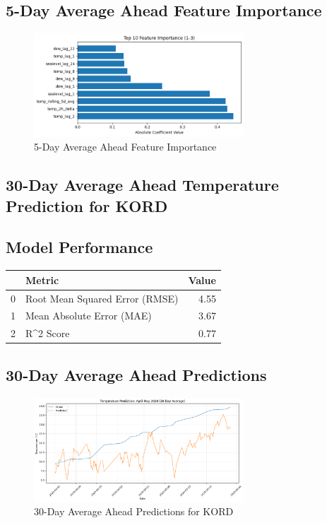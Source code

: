 \subsection{5-Day Average Ahead Feature Importance}
\begin{figure}[htbp]
\centering
\includegraphics[width=0.7\textwidth]{1-3-linear_temp_shift_feature_importance.png}
\caption{5-Day Average Ahead Feature Importance}
\label{fig:5-day_average_ahead_featimp}
\end{figure}



\subsection{30-Day Average Ahead Temperature Prediction for KORD}
\subsection{Model Performance}
\begin{tabular}{llr}
\toprule
 & Metric & Value \\
\midrule
0 & Root Mean Squared Error (RMSE) & 4.55 \\
1 & Mean Absolute Error (MAE) & 3.67 \\
2 & R^2 Score & 0.77 \\
\bottomrule
\end{tabular}

\subsection{30-Day Average Ahead Predictions}
\begin{figure}[htbp]
\centering
\includegraphics[width=0.7\textwidth]{1-4-linear_temp_shift_results.png}
\caption{30-Day Average Ahead Predictions for KORD}
\label{fig:30-day_average_ahead_pred}
\end{figure}

